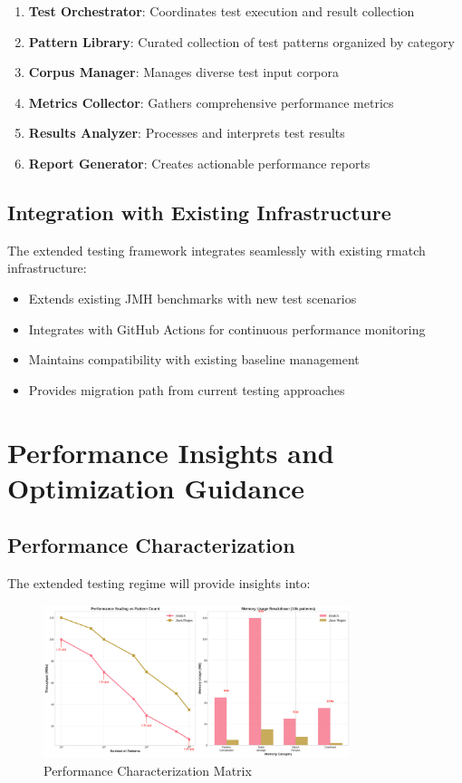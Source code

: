 \documentclass[11pt,a4paper]{article}
\begin{document}
\begin{enumerate}
    \item \textbf{Test Orchestrator}: Coordinates test execution and result collection
    \item \textbf{Pattern Library}: Curated collection of test patterns organized by category
    \item \textbf{Corpus Manager}: Manages diverse test input corpora
    \item \textbf{Metrics Collector}: Gathers comprehensive performance metrics
    \item \textbf{Results Analyzer}: Processes and interprets test results
    \item \textbf{Report Generator}: Creates actionable performance reports
\end{enumerate}

\subsection{Integration with Existing Infrastructure}

The extended testing framework integrates seamlessly with existing rmatch infrastructure:

\begin{itemize}
    \item Extends existing JMH benchmarks with new test scenarios
    \item Integrates with GitHub Actions for continuous performance monitoring
    \item Maintains compatibility with existing baseline management
    \item Provides migration path from current testing approaches
\end{itemize}

\section{Performance Insights and Optimization Guidance}

\subsection{Performance Characterization}

The extended testing regime will provide insights into:

\begin{figure}[H]
\centering
\includegraphics[width=0.8\textwidth]{illustrations/performance_characterization.png}
\caption{Performance Characterization Matrix}
\label{fig:performance_char}
\end{figure}
\end{document}
